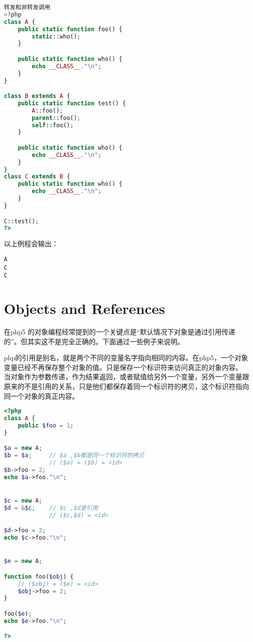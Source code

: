 \begin{lstlisting}[language=PHP]
转发和非转发调用
<?php
class A {
    public static function foo() {
        static::who();
    }

    public static function who() {
        echo __CLASS__."\n";
    }
}

class B extends A {
    public static function test() {
        A::foo();
        parent::foo();
        self::foo();
    }

    public static function who() {
        echo __CLASS__."\n";
    }
}
class C extends B {
    public static function who() {
        echo __CLASS__."\n";
    }
}

C::test();
?>
\end{lstlisting}

以上例程会输出：

\begin{verbatim}
A
C
C
\end{verbatim}


\chapter{Objects and References}

在php5 的对象编程经常提到的一个关键点是“默认情况下对象是通过引用传递的”。但其实这不是完全正确的。下面通过一些例子来说明。

php的引用是别名，就是两个不同的变量名字指向相同的内容。在php5，一个对象变量已经不再保存整个对象的值。只是保存一个标识符来访问真正的对象内容。 当对象作为参数传递，作为结果返回，或者赋值给另外一个变量，另外一个变量跟原来的不是引用的关系，只是他们都保存着同一个标识符的拷贝，这个标识符指向同一个对象的真正内容。


\begin{lstlisting}[language=PHP]
<?php
class A {
    public $foo = 1;
}  

$a = new A;
$b = $a;     // $a ,$b都是同一个标识符的拷贝
             // ($a) = ($b) = <id>
$b->foo = 2;
echo $a->foo."\n";


$c = new A;
$d = &$c;    // $c ,$d是引用
             // ($c,$d) = <id>

$d->foo = 2;
echo $c->foo."\n";


$e = new A;

function foo($obj) {
    // ($obj) = ($e) = <id>
    $obj->foo = 2;
}

foo($e);
echo $e->foo."\n";

?>
\end{lstlisting}

